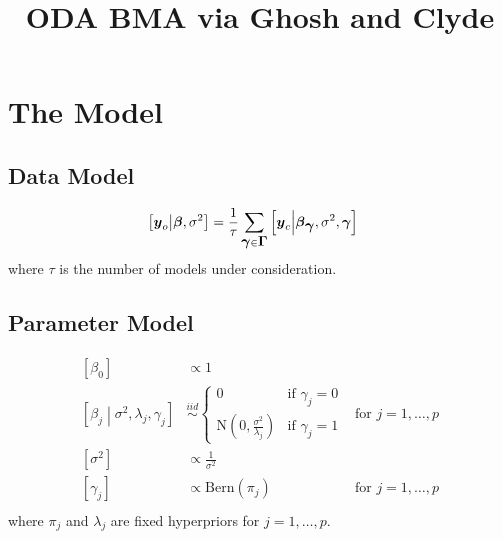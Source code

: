 \documentclass{article}
\title{ODA BMA via Ghosh and Clyde}
\def\bm#1{\mbox{\boldmath $#1$}}
\begin{document}
\section{The Model}
\subsection{Data Model}
%
\begin{align*}
%
\left[ \bm{y}_o \middle| \bm{\beta}, \sigma^2 \right] & = \frac{1} {\tau} \sum_{\bm{\gamma} \in \bm{\Gamma}} \left[ \bm{y}_c \middle| \bm{\beta}_{\bm{\gamma}}, \sigma^2, \bm{\gamma} \right]
%
\end{align*}
where $\tau$ is the number of models under consideration.
\subsection{Parameter Model}
\begin{align*}
%
\left[ \beta_0 \right] & \propto 1\\
%
\left[ \beta_j \middle| \sigma^2, \lambda_j, \gamma_j \right] & \stackrel{iid} {\sim} \begin{cases} 0 & \mbox{if } \gamma_j = 0\\ \mbox{N}\left( 0, \frac{\sigma^2} {\lambda_j} \right) & \mbox{if } \gamma_j = 1 \end{cases} & \mbox{for } j = 1, \ldots , p \\
%
\left[ \sigma^2 \right] & \propto \frac{1} {\sigma^2} \\
%
\left[ \gamma_j \right] & \propto \mbox{Bern} \left( \pi_j \right) & \mbox{for } j = 1, \ldots, p\\
%
\end{align*}
where $\pi_j$ and $\lambda_j$ are fixed hyperpriors for $j = 1, \ldots, p$.%
\end{document}
